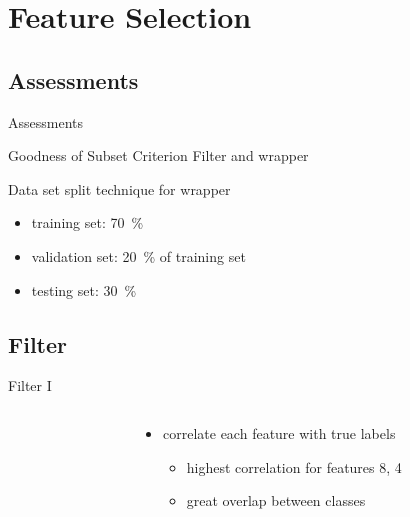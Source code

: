 \documentclass{beamer}
\begin{document}
\section{Feature Selection}
\subsection{Assessments}

\begin{frame}{Assessments}
\begin{block}{Goodness of Subset Criterion}
Filter and wrapper
\end{block}
\begin{block}{Data set split technique for wrapper}
\begin{itemize}
	\item{
	training set: \SI{70}{\percent}
	}
	\item{
	validation set: \SI{20}{\percent} of training set
	}
	\item{
	testing set: \SI{30}{\percent}
	}
\end{itemize}
\end{block}
\end{frame}

\subsection{Filter}

\begin{frame}{Filter I}
\begin{columns}[t]
\begin{column}{.5\textwidth}
\end{column}
\begin{column}{.5\textwidth}
\begin{itemize}
\item{
  correlate each feature with true labels
  }
\begin{itemize}
  \item{
    highest correlation for features 8, 4
    }
  \item{
    great overlap between classes
  }
  \end{itemize}
  \end{itemize}
\end{column}
\end{columns}
\end{frame}
\end{document}
